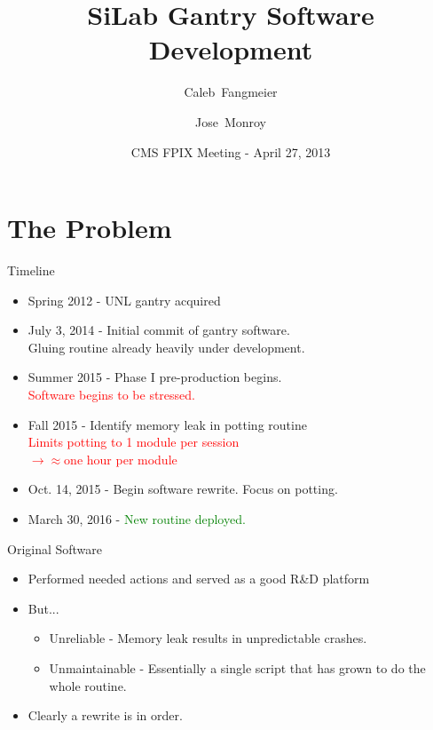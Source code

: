 \documentclass{beamer}
\title{SiLab Gantry Software Development}
\author{Caleb~Fangmeier \and Jose~Monroy}
\institute[UNL]{University of Nebraska - Lincoln}
\date{CMS FPIX Meeting - April 27, 2013}
\begin{document}
\begin{frame}
  \titlepage
\end{frame}

\section{The Problem}

\begin{frame}{Timeline}
  \begin{itemize}
  \item {
  Spring 2012 - UNL gantry acquired
  }
  \pause
  \item {
    July 3, 2014 - Initial commit of gantry software. \\
    Gluing routine already heavily under development.
  }
  \pause
  \item {
    Summer 2015 - Phase I pre-production begins. \\
    \textcolor{red}{Software begins to be stressed.}
  }
  \pause
  \item {
    Fall 2015 - Identify memory leak in potting routine \\
    \textcolor{red}{Limits potting to 1 module per session} \\
    \textcolor{red}{$\rightarrow \approx$one hour per module}
  }
  \pause
  \item {
    Oct. 14, 2015 - Begin software rewrite. Focus on potting.
  }
  \pause
  \item {
    March 30, 2016 - \textcolor{green}{New routine deployed.} 
  }
  \end{itemize}
\end{frame}

\begin{frame}{Original Software}
  \begin{itemize}
    \item Performed needed actions and served as a good R\&D platform
    \item But...
      \begin{itemize}
        \item Unreliable - Memory leak results in unpredictable crashes.
        \item Unmaintainable - Essentially a single script that has grown to do the whole routine.
      \end{itemize}
    \item Clearly a rewrite is in order.
  \end{itemize}
\end{frame}
\end{document}
